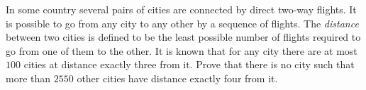 In some country several pairs of cities are connected by direct two-way flights. It is possible to go from any city to any other by a sequence of flights. The \emph{distance} between two cities is defined to be the least possible number of flights required to go from one of them to the other. It is known that for any city there are at most $100$ cities at distance exactly three from it. Prove that there is no city such that more than $2550$ other cities have distance exactly four from it.
